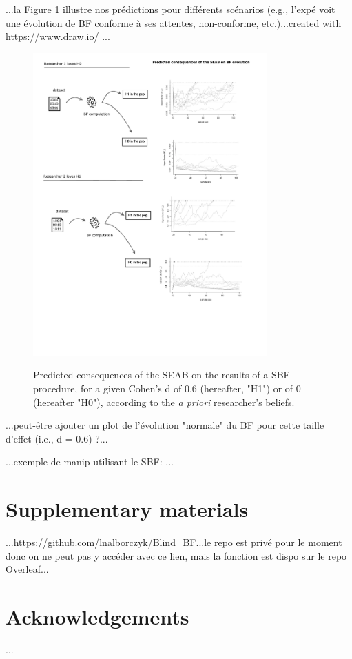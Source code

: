 \documentclass[a4paper,man,natbib,floatsintext]{apa6}
\begin{document}
...la Figure \ref{fig:pred} illustre nos prédictions pour différents scénarios (e.g., l'expé voit une évolution de BF conforme à ses attentes, non-conforme, etc.)...created with https://www.draw.io/ ...

\begin{figure}[H]
  \caption{Predicted consequences of the SEAB on the results of a SBF procedure, for a given Cohen's d of 0.6 (hereafter, "H1") or of 0 (hereafter "H0"), according to the \emph{a priori} researcher's beliefs.}
  \centering
  \includegraphics[width=0.8\textwidth]{figures/BFF_predictions.pdf}
  \label{fig:pred}
\end{figure}

...peut-être ajouter un plot de l'évolution "normale" du BF pour cette taille d'effet (i.e., d = 0.6) ?...

...exemple de manip utilisant le SBF: \cite{martin_perceiving_2016}...

\section{Supplementary materials}

...\url{https://github.com/lnalborczyk/Blind_BF}...le repo est privé pour le moment donc on ne peut pas y accéder avec ce lien, mais la fonction est dispo sur le repo Overleaf...

\section{Acknowledgements}

...



\end{document}
